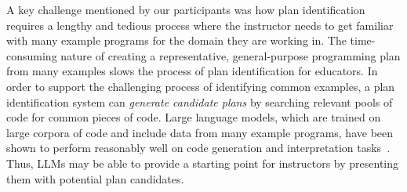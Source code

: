

A key challenge mentioned by our participants was how plan identification requires a lengthy and tedious process where the instructor needs to get familiar with many example programs for the domain they are working in. The time-consuming nature of creating a representative, general-purpose programming plan from many examples slows the process of plan identification for educators.
In order to support the challenging process of identifying common examples, a plan identification system can \textit{generate candidate plans} by searching relevant pools of code for common pieces of code.
Large language models, which are trained on large corpora of code and include data from many example programs, have been shown to perform reasonably well on code generation and interpretation tasks~\cite{juryEvaluatingLLMgeneratedWorked2024a, finnie-ansleyRobotsAreComing2022}. Thus, LLMs may be able to provide a starting point for instructors by presenting them with potential plan candidates. %


